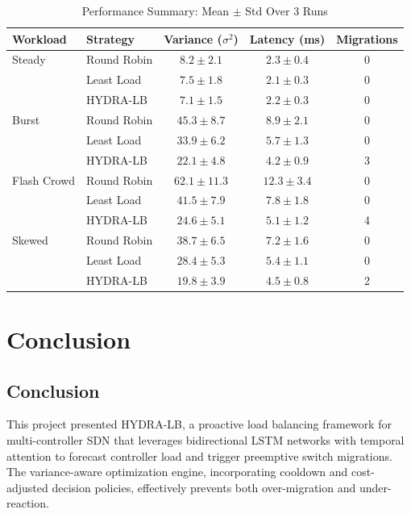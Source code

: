 \documentclass[12pt,a4paper]{report}
\begin{document}
\begin{table}[H]
\centering
\caption{Performance Summary: Mean $\pm$ Std Over 3 Runs}
\label{tab:results}
\begin{tabular}{llccc}
\toprule
\textbf{Workload} & \textbf{Strategy} & \textbf{Variance} ($\sigma^2$) & \textbf{Latency} (ms) & \textbf{Migrations} \\
\midrule
Steady & Round Robin & $8.2\pm2.1$ & $2.3\pm0.4$ & 0 \\
 & Least Load & $7.5\pm1.8$ & $2.1\pm0.3$ & 0 \\
 & HYDRA-LB & $7.1\pm1.5$ & $2.2\pm0.3$ & 0 \\
\midrule
Burst & Round Robin & $45.3\pm8.7$ & $8.9\pm2.1$ & 0 \\
 & Least Load & $33.9\pm6.2$ & $5.7\pm1.3$ & 0 \\
 & HYDRA-LB & $22.1\pm4.8$ & $4.2\pm0.9$ & 3 \\
\midrule
Flash Crowd & Round Robin & $62.1\pm11.3$ & $12.3\pm3.4$ & 0 \\
 & Least Load & $41.5\pm7.9$ & $7.8\pm1.8$ & 0 \\
 & HYDRA-LB & $24.6\pm5.1$ & $5.1\pm1.2$ & 4 \\
\midrule
Skewed & Round Robin & $38.7\pm6.5$ & $7.2\pm1.6$ & 0 \\
 & Least Load & $28.4\pm5.3$ & $5.4\pm1.1$ & 0 \\
 & HYDRA-LB & $19.8\pm3.9$ & $4.5\pm0.8$ & 2 \\
\bottomrule
\end{tabular}
\end{table}

\chapter{Conclusion}

\section{Conclusion}

This project presented HYDRA-LB, a proactive load balancing framework for multi-controller SDN that leverages bidirectional LSTM networks with temporal attention to forecast controller load and trigger preemptive switch migrations. The variance-aware optimization engine, incorporating cooldown and cost-adjusted decision policies, effectively prevents both over-migration and under-reaction.
\end{document}
